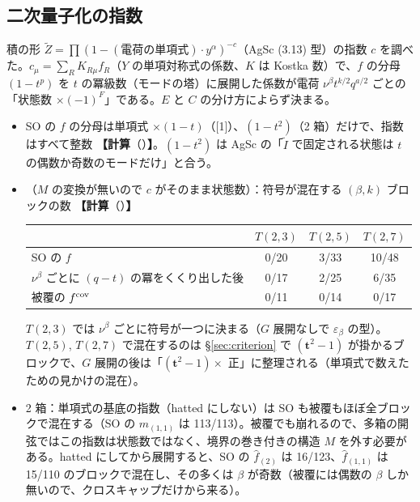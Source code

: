 \documentclass[a4paper,10pt]{ltjsarticle}
\newcommand{\bt}{\bm{t}}
\newcommand{\comp}[1]{\textbf{【計算}\if\relax\detokenize{#1}\relax\else（#1）\fi\textbf{】}}
\begin{document}
\subsection{二次量子化の指数}
積の形 $\tilde Z = \prod(1 - (\text{電荷の単項式})\cdot y^\alpha)^{-c}$（AgSc (3.13) 型）の指数 $c$ を調べた。$c_\mu = \sum_R K_{R\mu} f_R$（$Y$ の単項対称式の係数、$K$ は Kostka 数）で、$f$ の分母 $(1-t^p)$ を $t$ の冪級数（モードの塔）に展開した係数が電荷 $\nu^\beta t^{k/2} q^{a/2}$ ごとの「状態数 $\times (-1)^F$」である。$E$ と $C$ の分け方によらず決まる。
\begin{itemize}
\item SO の $f$ の分母は単項式 $\times (1-t)$（[1]）、$(1-t^2)$（2 箱）だけで、指数はすべて整数 \comp{}。$(1-t^2)$ は AgSc の「$\tilde I$ で固定される状態は $t$ の偶数か奇数のモードだけ」と合う。
\item [1]（$M$ の変換が無いので $c$ がそのまま状態数）：符号が混在する $(\beta, k)$ ブロックの数 \comp{}
\begin{center}
\begin{tabular}{p{6.2cm}ccc}
\toprule
& $T(2,3)$ & $T(2,5)$ & $T(2,7)$ \\
\midrule
SO の $f$ & 0/20 & 3/33 & 10/48 \\
$\nu^\beta$ ごとに $(q - t)$ の冪をくくり出した後 & 0/17 & 2/25 & 6/35 \\
被覆の $f^{\rm cov}$ & 0/11 & 0/14 & 0/17 \\
\bottomrule
\end{tabular}
\end{center}
$T(2,3)$ では $\nu^\beta$ ごとに符号が一つに決まる（$G$ 展開なしで $\varepsilon_\beta$ の型）。$T(2,5)$, $T(2,7)$ で混在するのは §\ref{sec:criterion} で $(\bt^2 - 1)$ が掛かるブロックで、$G$ 展開の後は「$(\bt^2-1) \times$ 正」に整理される（単項式で数えたための見かけの混在）。
\item 2 箱：単項式の基底の指数（hatted にしない）は SO も被覆もほぼ全ブロックで混在する（SO の $m_{(1,1)}$ は 113/113）。被覆でも崩れるので、多箱の開弦ではこの指数は状態数ではなく、境界の巻き付きの構造 $M$ を外す必要がある。hatted にしてから展開すると、SO の $\hat f_{(2)}$ は 16/123、$\hat f_{(1,1)}$ は 15/110 のブロックで混在し、その多くは $\beta$ が奇数（被覆には偶数の $\beta$ しか無いので、クロスキャップだけから来る）。
\end{itemize}
\end{document}
